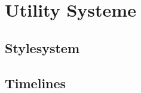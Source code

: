
\section{Utility Systeme}\label{sec:key-input-system}

\renewcommand{\kapitelautor}{Autor: Irgendwer} %

\subsection{Stylesystem}\label{subsec:stylesystem}

%
%

\subsection{Timelines}\label{subsec:timelines}

%
%

\renewcommand{\kapitelautor}{}

